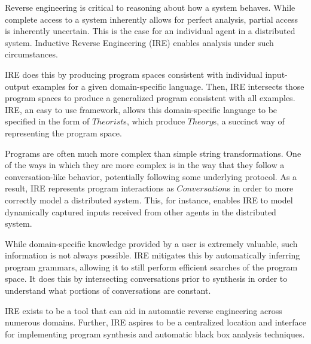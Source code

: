 Reverse engineering is critical to reasoning about how a system behaves.
While complete access to a system inherently allows for perfect analysis, partial access is inherently uncertain.
This is the case for an individual agent in a distributed system.
Inductive Reverse Engineering (IRE) enables analysis under such circumstances.

IRE does this by producing program spaces consistent with individual input-output examples for a given domain-specific language.
Then, IRE intersects those program spaces to produce a generalized program consistent with all examples.
IRE, an easy to use framework, allows this domain-specific language to be specified in the form of $Theorist$s, which produce $Theory$s, a succinct way of representing the program space.

Programs are often much more complex than simple string transformations.
One of the ways in which they are more complex is in the way that they follow a conversation-like behavior, potentially following some underlying protocol.
As a result, IRE represents program interactions as $Conversation$s in order to more correctly model a distributed system.
This, for instance, enables IRE to model dynamically captured inputs received from other agents in the distributed system.

While domain-specific knowledge provided by a user is extremely valuable, such information is not always possible.
IRE mitigates this by automatically inferring program grammars, allowing it to still perform efficient searches of the program space.
It does this by intersecting conversations prior to synthesis in order to understand what portions of conversations are constant.

IRE exists to be a tool that can aid in automatic reverse engineering across numerous domains.
Further, IRE aspires to be a centralized location and interface for implementing program synthesis and automatic black box analysis techniques.

